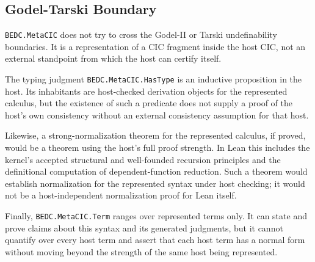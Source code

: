\subsection{Godel-Tarski Boundary}\label{subsec:reconstruction-godel-tarski-boundary}

\texttt{BEDC.MetaCIC} does not try to cross the Godel-II or Tarski
undefinability boundaries. It is a representation of a CIC fragment inside the
host CIC, not an external standpoint from which the host can certify itself.

The typing judgment \texttt{BEDC.MetaCIC.HasType} is an inductive proposition in
the host. Its inhabitants are host-checked derivation objects for the
represented calculus, but the existence of such a predicate does not supply a
proof of the host's own consistency without an external consistency assumption
for that host.

Likewise, a strong-normalization theorem for the represented calculus, if
proved, would be a theorem using the host's full proof strength. In Lean this
includes the kernel's accepted structural and well-founded recursion principles
and the definitional computation of dependent-function reduction. Such a theorem
would establish normalization for the represented syntax under host checking; it
would not be a host-independent normalization proof for Lean itself.

Finally, \texttt{BEDC.MetaCIC.Term} ranges over represented terms only. It can
state and prove claims about this syntax and its generated judgments, but it
cannot quantify over every host term and assert that each host term has a normal
form without moving beyond the strength of the same host being represented.
